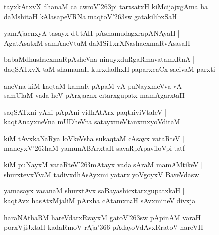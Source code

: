 \begin{shloka}
tayxkAtxvX dhanaM ca cwroV\char'263pi tarxsatxH kiMcijajxgAma ha |\\
daMshitaH kAlasapeVRNa maqtoV\char'263sw gatakilibxSaH
\end{shloka}

\begin{shloka}
yamAjacnxyA tasayx dUtAH pAshamudagxrapANAyaH |\\
AgatAsatxM samAneVtuM daMSiTxrXNashacxmaRvAsasaH
\end{shloka}

\begin{shloka}
babaMdhushacxmaRpAsheVna ninuyxduRgaRmavatamxRnA |\\
daqSATxvX taM shamanaH kurxdadhxH paparxcaCx sacivaM parxti
\end{shloka}

\begin{shloka}
aneVna kiM kaqtaM kamaR pApaM vA puNayxmeVva vA |\\
samUlaM vada heV pArxjacnx citarxgupatx mamAgarxtaH
\end{shloka}

\begin{shloka}
saqSATxni yAni pApAni vidhAtArx paqthiviVtaleV |\\
kaqtAnayxneVna mUDheVna satayxmeVtanxmxyoVditaM
\end{shloka}

\begin{shloka}
kiM tAvxkaNaRya loVkeVsha sukaqtaM cAsayx vataRteV |\\
maneyxV\char'263haM yamunABArxtaH savaRpApaviloVpi tatf
\end{shloka}

\begin{shloka}
kiM puNayxM vataRteV\char'263mAtayx vada sAraM mamAMtikeV |\\
shurxtevxYvaM tadivxdhAsAyxmi yatarx yoVgoyxV BaveVdasw
\end{shloka}

\begin{shloka}
yamasayx vacanaM shurxtAvx saBayashicxtarxgupatxkaH |\\
kaqtAvx hasAtxMjaliM pArxha cAtamxnaH sAvxmineV divxja
\end{shloka}

\begin{shloka}
haraNAthaRM hareVdarxRvayxM gatoV\char'263sw pApinAM varaH |\\
porxVjiJxtaH kadaRmoV rAja\char'366 pAdayoVdAvxRratoV hareVH 
\end{shloka}

